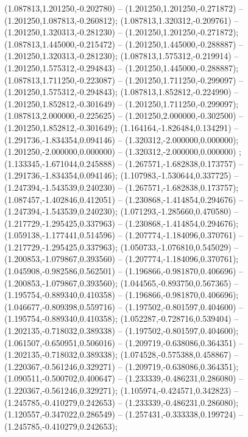  (1.087813,1.201250,-0.202780) -- (1.201250,1.201250,-0.271872) -- (1.201250,1.087813,-0.260812);
 (1.087813,1.320312,-0.209761) -- (1.201250,1.320313,-0.281230) -- (1.201250,1.201250,-0.271872);
 (1.087813,1.445000,-0.215472) -- (1.201250,1.445000,-0.288887) -- (1.201250,1.320313,-0.281230);
 (1.087813,1.575312,-0.219914) -- (1.201250,1.575312,-0.294843) -- (1.201250,1.445000,-0.288887);
 (1.087813,1.711250,-0.223087) -- (1.201250,1.711250,-0.299097) -- (1.201250,1.575312,-0.294843);
 (1.087813,1.852812,-0.224990) -- (1.201250,1.852812,-0.301649) -- (1.201250,1.711250,-0.299097);
 (1.087813,2.000000,-0.225625) -- (1.201250,2.000000,-0.302500) -- (1.201250,1.852812,-0.301649);
 (1.164164,-1.826484,0.134291) -- (1.291736,-1.834354,0.094146) -- (1.320312,-2.000000,0.000000);
 (1.201250,-2.000000,0.000000) -- (1.320312,-2.000000,0.000000) ;
 (1.133345,-1.671044,0.245888) -- (1.267571,-1.682838,0.173757) -- (1.291736,-1.834354,0.094146);
 (1.107983,-1.530644,0.337725) -- (1.247394,-1.543539,0.240230) -- (1.267571,-1.682838,0.173757);
 (1.087457,-1.402846,0.412051) -- (1.230868,-1.414854,0.294676) -- (1.247394,-1.543539,0.240230);
 (1.071293,-1.285660,0.470580) -- (1.217729,-1.295425,0.337963) -- (1.230868,-1.414854,0.294676);
 (1.059138,-1.177441,0.514596) -- (1.207774,-1.184096,0.370761) -- (1.217729,-1.295425,0.337963);
 (1.050733,-1.076810,0.545029) -- (1.200853,-1.079867,0.393560) -- (1.207774,-1.184096,0.370761);
 (1.045908,-0.982586,0.562501) -- (1.196866,-0.981870,0.406696) -- (1.200853,-1.079867,0.393560);
 (1.044565,-0.893750,0.567365) -- (1.195754,-0.889340,0.410358) -- (1.196866,-0.981870,0.406696);
 (1.046677,-0.809398,0.559716) -- (1.197502,-0.801597,0.404600) -- (1.195754,-0.889340,0.410358);
 (1.052287,-0.728716,0.539404) -- (1.202135,-0.718032,0.389338) -- (1.197502,-0.801597,0.404600);
 (1.061507,-0.650951,0.506016) -- (1.209719,-0.638086,0.364351) -- (1.202135,-0.718032,0.389338);
 (1.074528,-0.575388,0.458867) -- (1.220367,-0.561246,0.329271) -- (1.209719,-0.638086,0.364351);
 (1.090511,-0.500702,0.400647) -- (1.233339,-0.486231,0.286080) -- (1.220367,-0.561246,0.329271);
 (1.105974,-0.424571,0.342823) -- (1.245785,-0.410279,0.242653) -- (1.233339,-0.486231,0.286080);
 (1.120557,-0.347022,0.286549) -- (1.257431,-0.333338,0.199724) -- (1.245785,-0.410279,0.242653);
